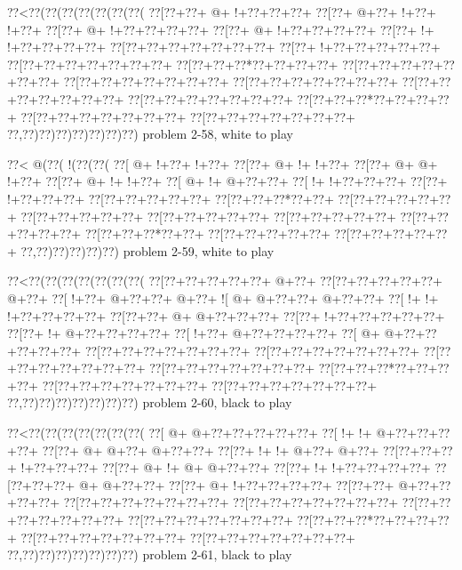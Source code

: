 \vbox{\vbox{\goo
\0??<\0??(\0??(\0??(\0??(\0??(\0??(\0??(
\0??[\0??+\0??+\- @+\- !+\0??+\0??+\0??+
\0??[\0??+\- @+\0??+\- !+\0??+\- !+\0??+
\0??[\0??+\- @+\- !+\0??+\0??+\0??+\0??+
\0??[\0??+\- @+\- !+\0??+\0??+\0??+\0??+
\0??[\0??+\- !+\- !+\0??+\0??+\0??+\0??+
\0??[\0??+\0??+\0??+\0??+\0??+\0??+\0??+
\0??[\0??+\- !+\0??+\0??+\0??+\0??+\0??+
\0??[\0??+\0??+\0??+\0??+\0??+\0??+\0??+
\0??[\0??+\0??+\0??*\0??+\0??+\0??+\0??+
\0??[\0??+\0??+\0??+\0??+\0??+\0??+\0??+
\0??[\0??+\0??+\0??+\0??+\0??+\0??+\0??+
\0??[\0??+\0??+\0??+\0??+\0??+\0??+\0??+
\0??[\0??+\0??+\0??+\0??+\0??+\0??+\0??+
\0??[\0??+\0??+\0??+\0??+\0??+\0??+\0??+
\0??[\0??+\0??+\0??*\0??+\0??+\0??+\0??+
\0??[\0??+\0??+\0??+\0??+\0??+\0??+\0??+
\0??[\0??+\0??+\0??+\0??+\0??+\0??+\0??+
\0??,\0??)\0??)\0??)\0??)\0??)\0??)\0??)
}
\hfil problem 2-58, white to play\hfil\break
}

\vbox{\vbox{\goo
\0??<\- @(\0??(\- !(\0??(\0??(
\0??[\- @+\- !+\0??+\- !+\0??+
\0??[\0??+\- @+\- !+\- !+\0??+
\0??[\0??+\- @+\- @+\- !+\0??+
\0??[\0??+\- @+\- !+\- !+\0??+
\0??[\- @+\- !+\- @+\0??+\0??+
\0??[\- !+\- !+\0??+\0??+\0??+
\0??[\0??+\- !+\0??+\0??+\0??+
\0??[\0??+\0??+\0??+\0??+\0??+
\0??[\0??+\0??+\0??*\0??+\0??+
\0??[\0??+\0??+\0??+\0??+\0??+
\0??[\0??+\0??+\0??+\0??+\0??+
\0??[\0??+\0??+\0??+\0??+\0??+
\0??[\0??+\0??+\0??+\0??+\0??+
\0??[\0??+\0??+\0??+\0??+\0??+
\0??[\0??+\0??+\0??*\0??+\0??+
\0??[\0??+\0??+\0??+\0??+\0??+
\0??[\0??+\0??+\0??+\0??+\0??+
\0??,\0??)\0??)\0??)\0??)\0??)
}
\hfil problem 2-59, white to play\hfil\break
}

\vbox{\vbox{\goo
\0??<\0??(\0??(\0??(\0??(\0??(\0??(\0??(
\0??[\0??+\0??+\0??+\0??+\0??+\- @+\0??+
\0??[\0??+\0??+\0??+\0??+\0??+\- @+\0??+
\0??[\- !+\0??+\- @+\0??+\0??+\- @+\0??+
\- ![\- @+\- @+\0??+\0??+\- @+\0??+\0??+
\0??[\- !+\- !+\- !+\0??+\0??+\0??+\0??+
\0??[\0??+\0??+\- @+\- @+\0??+\0??+\0??+
\0??[\0??+\- !+\0??+\0??+\0??+\0??+\0??+
\0??[\0??+\- !+\- @+\0??+\0??+\0??+\0??+
\0??[\- !+\0??+\- @+\0??+\0??+\0??+\0??+
\0??[\- @+\- @+\0??+\0??+\0??+\0??+\0??+
\0??[\0??+\0??+\0??+\0??+\0??+\0??+\0??+
\0??[\0??+\0??+\0??+\0??+\0??+\0??+\0??+
\0??[\0??+\0??+\0??+\0??+\0??+\0??+\0??+
\0??[\0??+\0??+\0??+\0??+\0??+\0??+\0??+
\0??[\0??+\0??+\0??*\0??+\0??+\0??+\0??+
\0??[\0??+\0??+\0??+\0??+\0??+\0??+\0??+
\0??[\0??+\0??+\0??+\0??+\0??+\0??+\0??+
\0??,\0??)\0??)\0??)\0??)\0??)\0??)\0??)
}
\hfil problem 2-60, black to play\hfil\break
}

\vbox{\vbox{\goo
\0??<\0??(\0??(\0??(\0??(\0??(\0??(\0??(
\0??[\- @+\- @+\0??+\0??+\0??+\0??+\0??+
\0??[\- !+\- !+\- @+\0??+\0??+\0??+\0??+
\0??[\0??+\- @+\- @+\0??+\- @+\0??+\0??+
\0??[\0??+\- !+\- !+\- @+\0??+\- @+\0??+
\0??[\0??+\0??+\0??+\- !+\0??+\0??+\0??+
\0??[\0??+\- @+\- !+\- @+\- @+\0??+\0??+
\0??[\0??+\- !+\- !+\0??+\0??+\0??+\0??+
\0??[\0??+\0??+\0??+\- @+\- @+\0??+\0??+
\0??[\0??+\- @+\- !+\0??+\0??+\0??+\0??+
\0??[\0??+\0??+\- @+\0??+\0??+\0??+\0??+
\0??[\0??+\0??+\0??+\0??+\0??+\0??+\0??+
\0??[\0??+\0??+\0??+\0??+\0??+\0??+\0??+
\0??[\0??+\0??+\0??+\0??+\0??+\0??+\0??+
\0??[\0??+\0??+\0??+\0??+\0??+\0??+\0??+
\0??[\0??+\0??+\0??*\0??+\0??+\0??+\0??+
\0??[\0??+\0??+\0??+\0??+\0??+\0??+\0??+
\0??[\0??+\0??+\0??+\0??+\0??+\0??+\0??+
\0??,\0??)\0??)\0??)\0??)\0??)\0??)\0??)
}
\hfil problem 2-61, black to play\hfil\break
}

